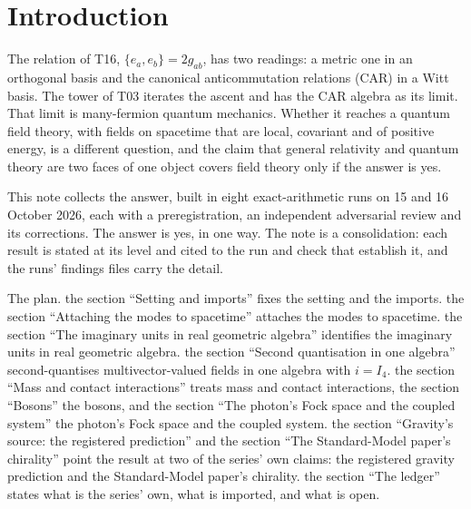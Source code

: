 \documentclass[11pt]{article}
\theoremstyle{definition}
\theoremstyle{plain}
\begin{document}
\section{Introduction}

\label{c:note.field-theory.setting-introduction}
The relation of T16, $\{e_a, e_b\} = 2g_{ab}$, has two readings: a metric one in an orthogonal basis and the canonical anticommutation relations (CAR) in a Witt basis. The tower of T03 iterates the ascent and has the CAR algebra as its limit. That limit is many-fermion quantum mechanics. Whether it reaches a quantum field theory, with fields on spacetime that are local, covariant and of positive energy, is a different question, and the claim that general relativity and quantum theory are two faces of one object covers field theory only if the answer is yes.

This note collects the answer, built in eight exact-arithmetic runs on 15 and 16 October 2026, each with a preregistration, an independent adversarial review and its corrections. The answer is yes, in one way. The note is a consolidation: each result is stated at its level and cited to the run and check that establish it, and the runs' findings files carry the detail.

The plan. the section ``Setting and imports'' fixes the setting and the imports. the section ``Attaching the modes to spacetime'' attaches the modes to spacetime. the section ``The imaginary units in real geometric algebra'' identifies the imaginary units in real geometric algebra. the section ``Second quantisation in one algebra'' second-quantises multivector-valued fields in one algebra with $i = I_4$. the section ``Mass and contact interactions'' treats mass and contact interactions, the section ``Bosons'' the bosons, and the section ``The photon's Fock space and the coupled system'' the photon's Fock space and the coupled system. the section ``Gravity's source: the registered prediction'' and the section ``The Standard-Model paper's chirality'' point the result at two of the series' own claims: the registered gravity prediction and the Standard-Model paper's chirality. the section ``The ledger'' states what is the series' own, what is imported, and what is open.
\end{document}
